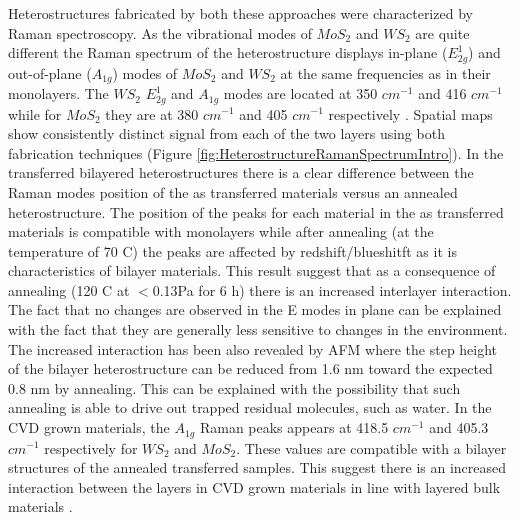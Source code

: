 Heterostructures fabricated by both these approaches were characterized by Raman spectroscopy. As the vibrational modes of $MoS_2$ and $WS_2$ are quite different the Raman spectrum of the heterostructure displays in-plane ($E^1_{2g}$) and out-of-plane ($A_{1g}$) modes of $MoS_2$ and $WS_2$ at the same frequencies as in their monolayers. The $WS_2$ $E^1_{2g}$ and $A_{1g}$ modes are located at 350 $cm^{-1}$ and 416 $cm^{-1}$ while for $MoS_2$ they are at 380 $cm^{-1}$ and 405 $cm^{-1}$ respectively \cite{Tongay2014}. Spatial maps show consistently distinct signal from each of the two layers using both fabrication techniques (Figure \ref{fig:HeterostructureRamanSpectrumIntro}). In the transferred bilayered heterostructures there is a clear difference  between the Raman modes position of the as transferred materials versus an annealed heterostructure. The position of the peaks for each material in the as transferred materials is compatible with  monolayers while after annealing (at the temperature of 70 {\degree}C) the peaks are affected by redshift/blueshitft as it is characteristics of bilayer materials. This result suggest that as a consequence of annealing (120 {\degree}C at $<$0.13Pa for 6 h) there is an increased interlayer interaction. The fact that no changes are observed in the E modes in plane can be explained with the fact that they are generally less sensitive to changes in the environment. The increased interaction has been also revealed by AFM where the step height of the bilayer heterostructure can be reduced from 1.6 nm toward the expected 0.8 nm by annealing. This can be explained with the possibility that such annealing is able to drive out trapped residual molecules, such as water. In the CVD grown materials, the $A_{1g}$ Raman peaks appears at 418.5 $cm^{-1}$ and 405.3 $cm^{-1}$ respectively for $WS_2$ and $MoS_2$. These values are compatible with a bilayer structures of the annealed transferred samples. This suggest there is an increased interaction between the layers in CVD grown materials in line with layered bulk materials \cite{Tongay2014}.


